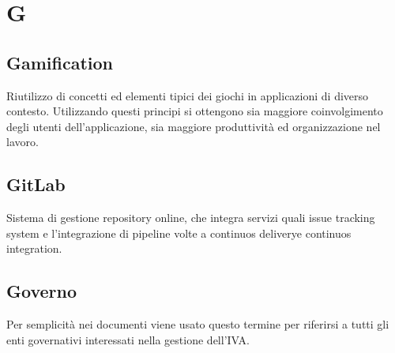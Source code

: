 \section*{G}
\subsection*{Gamification}
Riutilizzo di concetti ed elementi tipici dei giochi in applicazioni di diverso contesto. Utilizzando questi principi si ottengono sia maggiore coinvolgimento degli utenti dell'applicazione, sia maggiore produttività ed organizzazione nel lavoro.

\subsection*{GitLab}
Sistema di gestione repository online, che integra servizi quali issue tracking system e l'integrazione di pipeline volte a continuos delivery\glosp e continuos integration\glo.

\subsection*{Governo}
Per semplicità nei documenti viene usato questo termine per riferirsi a tutti gli enti governativi interessati nella gestione dell'IVA.

